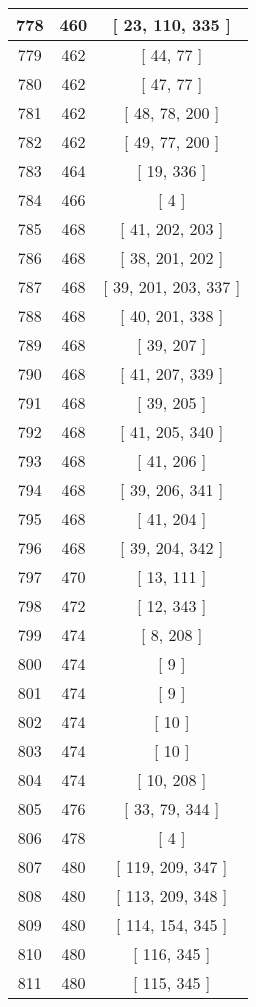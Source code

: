 \begin{center}
\begin{longtable}[H]{|| c c c ||}
\hline
778 & 460 & [ 23, 110, 335 ] \\ 
\hline
779 & 462 & [ 44, 77 ] \\ 
\hline
780 & 462 & [ 47, 77 ] \\ 
\hline
781 & 462 & [ 48, 78, 200 ] \\ 
\hline
782 & 462 & [ 49, 77, 200 ] \\ 
\hline
783 & 464 & [ 19, 336 ] \\ 
\hline
784 & 466 & [ 4 ] \\ 
\hline
785 & 468 & [ 41, 202, 203 ] \\ 
\hline
786 & 468 & [ 38, 201, 202 ] \\ 
\hline
787 & 468 & [ 39, 201, 203, 337 ] \\ 
\hline
788 & 468 & [ 40, 201, 338 ] \\ 
\hline
789 & 468 & [ 39, 207 ] \\ 
\hline
790 & 468 & [ 41, 207, 339 ] \\ 
\hline
791 & 468 & [ 39, 205 ] \\ 
\hline
792 & 468 & [ 41, 205, 340 ] \\ 
\hline
793 & 468 & [ 41, 206 ] \\ 
\hline
794 & 468 & [ 39, 206, 341 ] \\ 
\hline
795 & 468 & [ 41, 204 ] \\ 
\hline
796 & 468 & [ 39, 204, 342 ] \\ 
\hline
797 & 470 & [ 13, 111 ] \\ 
\hline
798 & 472 & [ 12, 343 ] \\ 
\hline
799 & 474 & [ 8, 208 ] \\ 
\hline
800 & 474 & [ 9 ] \\ 
\hline
801 & 474 & [ 9 ] \\ 
\hline
802 & 474 & [ 10 ] \\ 
\hline
803 & 474 & [ 10 ] \\ 
\hline
804 & 474 & [ 10, 208 ] \\ 
\hline
805 & 476 & [ 33, 79, 344 ] \\ 
\hline
806 & 478 & [ 4 ] \\ 
\hline
807 & 480 & [ 119, 209, 347 ] \\ 
\hline
808 & 480 & [ 113, 209, 348 ] \\ 
\hline
809 & 480 & [ 114, 154, 345 ] \\ 
\hline
810 & 480 & [ 116, 345 ] \\ 
\hline
811 & 480 & [ 115, 345 ] \\ 
\hline

\end{longtable}
\end{center}

